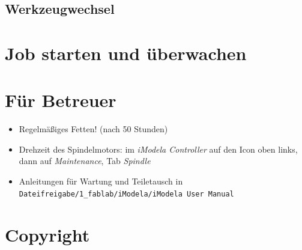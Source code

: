 \documentclass{\basedir/fablab-document}
\begin{document}
\subsection{Werkzeugwechsel}

\section{Job starten und überwachen}

\section{Für Betreuer}
\begin{itemize}
	\item Regelmäßiges Fetten! (nach 50 Stunden)
	\item Drehzeit des Spindelmotors: im \emph{iModela Controller} auf den Icon oben links, dann auf \emph{Maintenance}, Tab \emph{Spindle} 
	\item Anleitungen für Wartung und Teiletausch in \texttt{Dateifreigabe/1\_fablab/iModela/iModela User Manual}
\end{itemize}

\section{Copyright}
\end{document}
